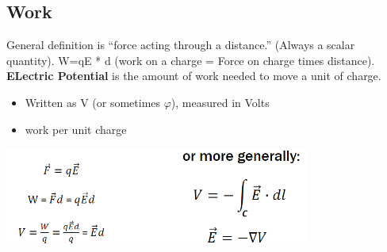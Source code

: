 \documentclass[a4paper,12pt]{article}
\begin{document}
        \subsection*{Work}
        General definition is “force acting through a distance.” (Always a scalar
        quantity). W=qE * d (work on a charge = Force on charge times distance).
        \textbf{ELectric Potential} is the amount of work needed to move a unit
        of charge.
        \begin{itemize}
            \item Written as V (or sometimes $\varphi$), measured in Volts
            \item work per unit charge
        \end{itemize}
        \includegraphics*[width=10cm]{Potential calc.png}
\end{document}
